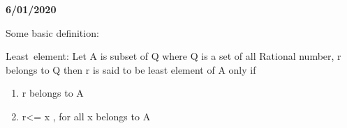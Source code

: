 \documentclass[12pt]{article}
\renewcommand{\_}{\kern-1.5pt\textunderscore\kern-1.5pt}
\begin{document}
\vspace{\baselineskip}

\vspace{\baselineskip}

\vspace{\baselineskip}

\vspace{\baselineskip}

\vspace{\baselineskip}

\vspace{\baselineskip}

\vspace{\baselineskip}

\vspace{\baselineskip}

\vspace{\baselineskip}

\vspace{\baselineskip}
\begin{FlushLeft}
{\fontsize{14pt}{16.8pt}\selectfont \textbf{6/01/2020}\par}
\end{FlushLeft}\par


\vspace{\baselineskip}
{\fontsize{14pt}{16.8pt}\selectfont Some basic definition:\par}\par


\vspace{\baselineskip}

\vspace{\baselineskip}
{\fontsize{14pt}{16.8pt}\selectfont Least\ element:  Let A is subset of Q where Q is a set of all Rational number, r belongs to Q then r is said to be least element of A only if\par}\par

\begin{enumerate}
	\item {\fontsize{14pt}{16.8pt}\selectfont r belongs to A\par}\par

	\item {\fontsize{14pt}{16.8pt}\selectfont r<= x , for all x belongs to A\par}
\end{enumerate}\par
\end{document}
